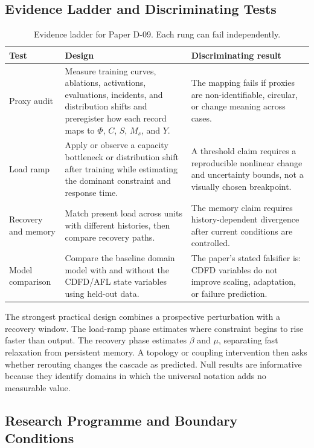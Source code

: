 \documentclass[12pt,a4paper]{article}
\begin{document}
\subsection{Evidence Ladder and Discriminating Tests}

\begin{table}[htbp]
\centering
\small
\caption{Evidence ladder for Paper D-09. Each rung can fail independently.}
\begin{tabularx}{\textwidth}{|p{}|X|X|}
\hline
\textbf{Test} & \textbf{Design} & \textbf{Discriminating result} \\
\hline
Proxy audit & Measure training curves, ablations, activations, evaluations, incidents, and distribution shifts and preregister how each record maps to $\Phi$, $C$, $S$, $M_s$, and $Y$. & The mapping fails if proxies are non-identifiable, circular, or change meaning across cases. \\
\hline
Load ramp & Apply or observe a capacity bottleneck or distribution shift after training while estimating the dominant constraint and response time. & A threshold claim requires a reproducible nonlinear change and uncertainty bounds, not a visually chosen breakpoint. \\
\hline
Recovery and memory & Match present load across units with different histories, then compare recovery paths. & The memory claim requires history-dependent divergence after current conditions are controlled. \\
\hline
Model comparison & Compare the baseline domain model with and without the CDFD/AFL state variables using held-out data. & The paper's stated falsifier is: CDFD variables do not improve scaling, adaptation, or failure prediction. \\
\hline
\end{tabularx}
\end{table}

The strongest practical design combines a prospective perturbation with a
recovery window. The load-ramp phase estimates where constraint begins to rise
faster than output. The recovery phase estimates $\beta$ and $\mu$, separating
fast relaxation from persistent memory. A topology or coupling intervention
then asks whether rerouting changes the cascade as predicted. Null results are
informative because they identify domains in which the universal notation adds
no measurable value.

\subsection{Research Programme and Boundary Conditions}
\end{document}
